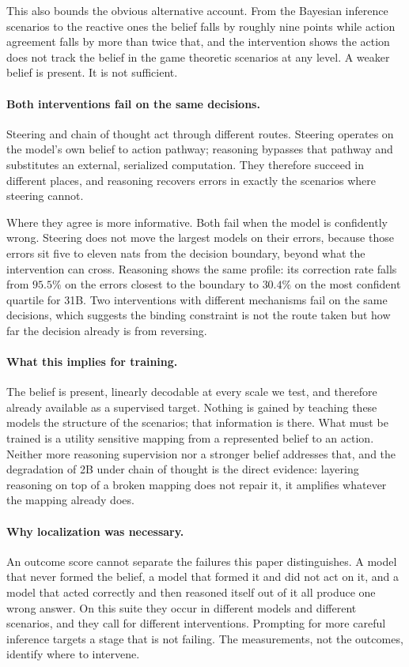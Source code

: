 This also bounds the obvious alternative account. From the Bayesian inference
scenarios to the reactive ones the belief falls by roughly nine points while
action agreement falls by more than twice that, and the intervention shows the
action does not track the belief in the game theoretic scenarios at any level.
A weaker belief is present. It is not sufficient.

\paragraph{Both interventions fail on the same decisions.}
Steering and chain of thought act through different routes. Steering operates
on the model's own belief to action pathway; reasoning bypasses that pathway
and substitutes an external, serialized computation. They therefore succeed in
different places, and reasoning recovers errors in exactly the scenarios where
steering cannot.

Where they agree is more informative. Both fail when the model is confidently
wrong. Steering does not move the largest models on their errors, because
those errors sit five to eleven nats from the decision boundary, beyond what
the intervention can cross. Reasoning shows the same profile: its correction
rate falls from \(95.5\%\) on the errors closest to the boundary to \(30.4\%\)
on the most confident quartile for  31B. Two interventions with
different mechanisms fail on the same decisions, which suggests the binding
constraint is not the route taken but how far the decision already is from
reversing.

\paragraph{What this implies for training.}
The belief is present, linearly decodable at every scale we test, and
therefore already available as a supervised target. Nothing is gained by
teaching these models the structure of the scenarios; that information is
there. What must be trained is a utility sensitive mapping from a represented
belief to an action. Neither more reasoning supervision nor a stronger belief
addresses that, and the degradation of  2B under chain of
thought is the direct evidence: layering reasoning on top of a broken mapping
does not repair it, it amplifies whatever the mapping already does.

\paragraph{Why localization was necessary.}
An outcome score cannot separate the failures this paper distinguishes. A
model that never formed the belief, a model that formed it and did not act on
it, and a model that acted correctly and then reasoned itself out of it all
produce one wrong answer. On this suite they occur in different models and
different scenarios, and they call for different interventions. Prompting for
more careful inference targets a stage that is not failing. The measurements,
not the outcomes, identify where to intervene.

